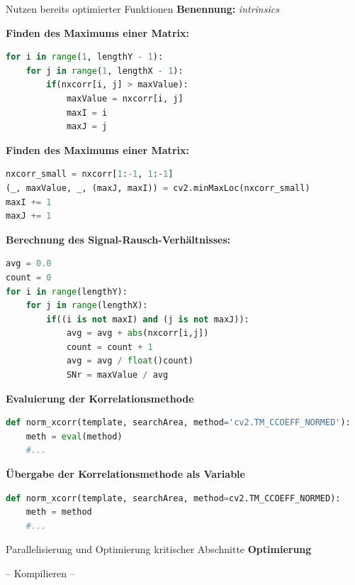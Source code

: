 \begin{frame}{Nutzen bereits optimierter Funktionen}
	\textbf{Benennung:} \textit{intrinsics}
	
	\textbf{Finden des Maximums einer Matrix:}
	\begin{lstlisting}[language=Python]
for i in range(1, lengthY - 1):
	for j in range(1, lengthX - 1):
		if(nxcorr[i, j] > maxValue):
			maxValue = nxcorr[i, j]
			maxI = i
			maxJ = j
	\end{lstlisting}
	
	\framebreak
	
	\textbf{Finden des Maximums einer Matrix:}
	\begin{lstlisting}[language=Python]
nxcorr_small = nxcorr[1:-1, 1:-1]
(_, maxValue, _, (maxJ, maxI)) = cv2.minMaxLoc(nxcorr_small)
maxI += 1
maxJ += 1
	\end{lstlisting}
	
	\framebreak
	
	\textbf{Berechnung des Signal-Rausch-Verhältnisses:}
	\begin{lstlisting}[language=Python]
avg = 0.0
count = 0
for i in range(lengthY):
	for j in range(lengthX):
		if((i is not maxI) and (j is not maxJ)):
			avg = avg + abs(nxcorr[i,j])
			count = count + 1
			avg = avg / float()count)
			SNr = maxValue / avg
	\end{lstlisting}
	
	\framebreak
	
	\textbf{Evaluierung der Korrelationsmethode}
	\begin{lstlisting}[language=Python]
def norm_xcorr(template, searchArea, method='cv2.TM_CCOEFF_NORMED'):
	meth = eval(method)
	#...
	\end{lstlisting}
	
	\framebreak
	
	\textbf{Übergabe der Korrelationsmethode als Variable}
	\begin{lstlisting}[language=Python]
def norm_xcorr(template, searchArea, method=cv2.TM_CCOEFF_NORMED):
	meth = method
	#...
	\end{lstlisting}
\end{frame}

\begin{frame}{Parallelisierung und Optimierung kritischer Abschnitte}
	\centering
	\LARGE
	\textbf{Optimierung}
	
	\vspace{0.5cm}
	
	\large
	-- Kompilieren --
\end{frame}

